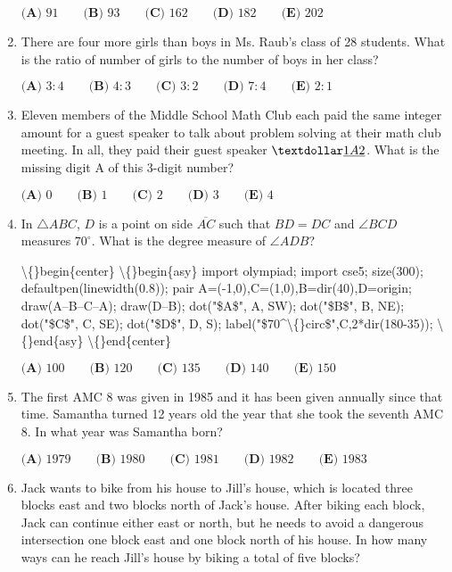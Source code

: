 \documentclass{article}
\begin{document}
\begin{enumerate}[label=\arabic*., itemsep=0.5em]
\( \textbf{(A) }91\qquad\textbf{(B) }93\qquad\textbf{(C) }162\qquad\textbf{(D) }182\qquad\textbf{(E) }202 \)\par \vspace{0.5em}\item There are four more girls than boys in Ms. Raub's class of 28 students. What is the ratio of number of girls to the number of boys in her class?

\( \textbf{(A) }3 : 4\qquad\textbf{(B) }4 : 3\qquad\textbf{(C) }3 : 2\qquad\textbf{(D) }7 : 4\qquad\textbf{(E) }2 : 1 \)\par \vspace{0.5em}\item Eleven members of the Middle School Math Club each paid the same integer amount for a guest speaker to talk about problem solving at their math club meeting. In all, they paid their guest speaker \(\textdollar\underline{1}\underline{A}\underline{2} \). What is the missing digit A of this 3-digit number?

\( \textbf{(A) }0\qquad\textbf{(B) }1\qquad\textbf{(C) }2\qquad\textbf{(D) }3\qquad\textbf{(E) }4 \)\par \vspace{0.5em}\item In \(\bigtriangleup ABC\), \(D\) is a point on side \(\overline{AC}\) such that \(BD=DC\) and \(\angle BCD\) measures \(70^\circ\). What is the degree measure of \(\angle ADB\)?


\textbackslash\{\}begin\{center\}
\textbackslash\{\}begin\{asy\}
import olympiad;
import cse5;
size(300);
defaultpen(linewidth(0.8));
pair A=(-1,0),C=(1,0),B=dir(40),D=origin;
draw(A--B--C--A);
draw(D--B);
dot("\$A\$", A, SW);
dot("\$B\$", B, NE);
dot("\$C\$", C, SE);
dot("\$D\$", D, S);
label("\$70\^{}\textbackslash\{\}circ\$",C,2*dir(180-35));
\textbackslash\{\}end\{asy\}
\textbackslash\{\}end\{center\}


\(\textbf{(A) }100\qquad\textbf{(B) }120\qquad\textbf{(C) }135\qquad\textbf{(D) }140\qquad \textbf{(E) }150\)\par \vspace{0.5em}\item The first AMC 8 was given in 1985 and it has been given annually since that time. Samantha turned 12 years old the year that she took the seventh AMC 8. In what year was Samantha born?

\(\textbf{(A) }1979\qquad\textbf{(B) }1980\qquad\textbf{(C) }1981\qquad\textbf{(D) }1982\qquad \textbf{(E) }1983\)\par \vspace{0.5em}\item Jack wants to bike from his house to Jill's house, which is located three blocks east and two blocks north of Jack's house. After biking each block, Jack can continue either east or north, but he needs to avoid a dangerous intersection one block east and one block north of his house. In how many ways can he reach Jill's house by biking a total of five blocks?


\end{enumerate}
\end{document}
